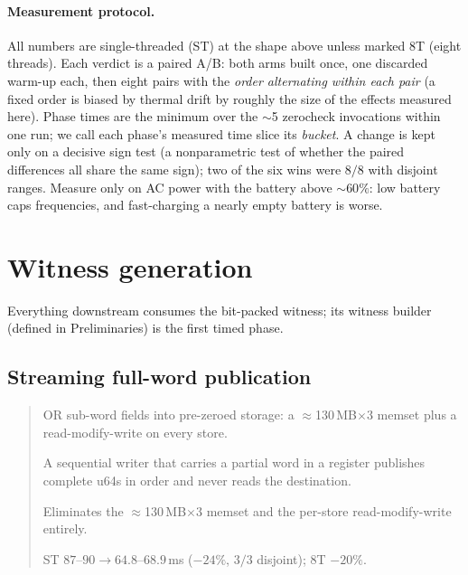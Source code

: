 \documentclass[11pt]{article}
\newenvironment{optsummary}{%
  \begin{quote}\small
  \begin{description}
  \setlength{\itemsep}{1pt}\setlength{\parsep}{0pt}\setlength{\topsep}{2pt}
}{%
  \end{description}
  \end{quote}
}
\begin{document}
\paragraph{Measurement protocol.}
All numbers are single-threaded (ST) at the shape above unless marked 8T
(eight threads). Each verdict is a paired A/B: both arms built once, one
discarded warm-up each, then eight pairs with the \emph{order alternating
within each pair} (a fixed order is biased by thermal drift by roughly the
size of the effects measured here). Phase times are the minimum over the
$\sim$5 zerocheck invocations within one run; we call each phase's measured
time slice its \emph{bucket}. A change is kept only on a decisive sign test
(a nonparametric test of whether the paired differences all share the same
sign); two of the six wins were $8/8$ with disjoint ranges. Measure only on
AC power with the battery above $\sim60\%$: low battery caps frequencies,
and fast-charging a nearly empty battery is worse.

\section{Witness generation}

Everything downstream consumes the bit-packed witness; its witness builder
(defined in Preliminaries) is the first timed phase.

\subsection{Streaming full-word publication}
\label{sec:streamwit}

\begin{optsummary}
\item[Baseline:] OR sub-word fields into pre-zeroed storage: a $\approx$130\,MB$\times$3 memset plus a read-modify-write on every store.
\item[Improvement:] A sequential writer that carries a partial word in a register publishes complete u64s in order and never reads the destination.
\item[Mechanism:] Eliminates the $\approx$130\,MB$\times$3 memset and the per-store read-modify-write entirely.
\item[Result:] ST $87$--$90\to64.8$--$68.9\,$ms ($-24\%$, $3/3$ disjoint); 8T $-20\%$.
\end{optsummary}
\end{document}
